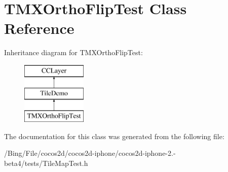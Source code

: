\hypertarget{interface_t_m_x_ortho_flip_test}{\section{T\-M\-X\-Ortho\-Flip\-Test Class Reference}
\label{interface_t_m_x_ortho_flip_test}
}
Inheritance diagram for T\-M\-X\-Ortho\-Flip\-Test\-:\begin{figure}[H]
\begin{center}
\leavevmode
\includegraphics[height=3.000000cm]{interface_t_m_x_ortho_flip_test}
\end{center}
\end{figure}


The documentation for this class was generated from the following file\-:\begin{DoxyCompactItemize}
\item 
/\-Bing/\-File/cocos2d/cocos2d-\/iphone/cocos2d-\/iphone-\/2.-\/beta4/tests/Tile\-Map\-Test.\-h\end{DoxyCompactItemize}
